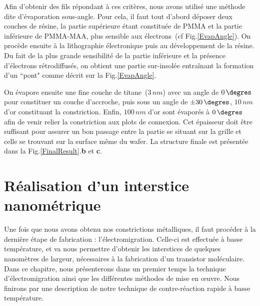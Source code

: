 Afin d'obtenir des fils répondant à ces critères, nous avons utilisé une méthode dite d'évaporation sous-angle. Pour cela, il faut tout d'abord déposer deux couches de résine, la partie supérieure étant constituée de PMMA et la partie inférieure de PMMA-MAA, plus sensible aux électrons~(cf Fig.\ref{EvapAngle}). On procède ensuite à la lithographie électronique puis au développement de la résine. Du fait de la plus grande sensibilité de la partie inférieure et la présence d'électrons rétrodiffusés, on obtient une partie sur-insolée entraînant la formation d'un ``pont" comme décrit sur la Fig.\ref{EvapAngle}.

On évapore ensuite une fine couche de titane~(3$\, nm$) avec un angle de $0\,\degres$ pour constituer un couche d'accroche, puis sous un angle de $\pm30\,\degres$, $10\, nm$ d'or  constituant la constriction. Enfin, $100\,nm$ d'or sont évaporés à $0\,\degres$ afin de venir relier la constriction aux plots de connexion. Cet épaisseur doit être suffisant pour assurer un bon passage entre la partie se situant sur la grille et celle se trouvant sur la surface même du wafer. La structure finale est présentée dans la Fig.\ref{FinalResult}.\textbf{b} et \textbf{c}.



\section{Réalisation d'un interstice nanométrique}
Une fois que nous avons obtenu nos constrictions métalliques, il faut procéder à la dernière étape de fabrication : l'électromigration. Celle-ci est effectuée à basse température, et va nous permettre d'obtenir les interstices de quelques nanomètres de largeur, nécessaires à la fabrication d'un transistor moléculaire. Dans ce chapitre, nous présenterons dans un premier temps la technique d'électromigration ainsi que les différentes méthodes de mise en œuvre. Nous finirons par une description de notre technique de contre-réaction rapide à basse température.

